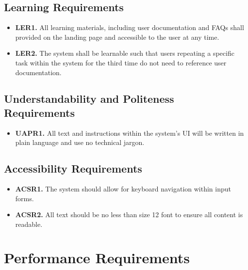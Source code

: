 \documentclass[12pt]{article}
\begin{document}
\subsection{Learning Requirements}

\label{LER}

\begin{itemize}
    \item \textbf{LER1.} All learning materials, including user documentation and FAQs shall provided on the landing page and accessible to the user at any time.
    \item \textbf{LER2.} The system shall be learnable such that users repeating a specific task within the system for the third time do not need to reference user documentation.
\end{itemize}

\subsection{Understandability and Politeness Requirements}

\label{UAPR}

\begin{itemize}
    \item \hypertarget{UAPROne}{ \textbf{UAPR1.} All text and instructions within the system's UI will be written in plain language and use no technical jargon. }
\end{itemize}

\subsection{Accessibility Requirements}

\label{ACSR}

\begin{itemize}
    \item \hypertarget{ACSROne}{ \textbf{ACSR1.} The system should allow for keyboard navigation within input forms. }
    \item \hypertarget{ACSRTwo}{ \textbf{ACSR2.} All text should be no less than size 12 font to ensure all content is readable. }
\end{itemize}

\section{Performance Requirements}

\label{PerformanceReq}
\end{document}
